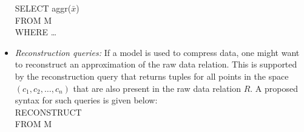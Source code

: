 \documentclass{sig-alternate}
\begin{document}
\begin{itemize}
SELECT aggr($\bar{x}$)\\
FROM M\\
WHERE \ldots
%
\item \emph{Reconstruction queries:} If a model is used to compress data, one might want to reconstruct an approximation of the raw data relation. This is supported by the reconstruction query that returns tuples for all points in the space $(c_1, c_2, \ldots, c_n)$ that are also present in the raw data relation $R$. A proposed syntax for such queries is given below:\\

RECONSTRUCT\\
FROM M 

\end{itemize}
\end{document}
